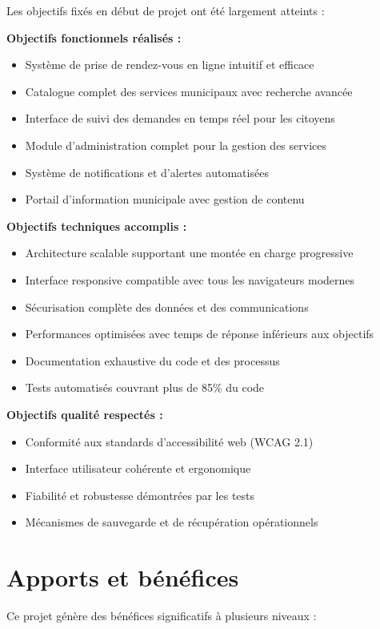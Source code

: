 Les objectifs fixés en début de projet ont été largement atteints :

\textbf{Objectifs fonctionnels réalisés :}
\begin{itemize}
\item Système de prise de rendez-vous en ligne intuitif et efficace
\item Catalogue complet des services municipaux avec recherche avancée
\item Interface de suivi des demandes en temps réel pour les citoyens
\item Module d'administration complet pour la gestion des services
\item Système de notifications et d'alertes automatisées
\item Portail d'information municipale avec gestion de contenu
\end{itemize}

\textbf{Objectifs techniques accomplis :}
\begin{itemize}
\item Architecture scalable supportant une montée en charge progressive
\item Interface responsive compatible avec tous les navigateurs modernes
\item Sécurisation complète des données et des communications
\item Performances optimisées avec temps de réponse inférieurs aux objectifs
\item Documentation exhaustive du code et des processus
\item Tests automatisés couvrant plus de 85\% du code
\end{itemize}

\textbf{Objectifs qualité respectés :}
\begin{itemize}
\item Conformité aux standards d'accessibilité web (WCAG 2.1)
\item Interface utilisateur cohérente et ergonomique
\item Fiabilité et robustesse démontrées par les tests
\item Mécanismes de sauvegarde et de récupération opérationnels
\end{itemize}

\section*{Apports et bénéfices}

Ce projet génère des bénéfices significatifs à plusieurs niveaux :

